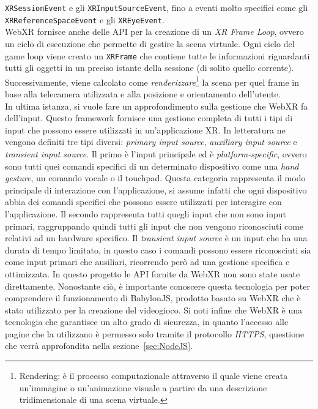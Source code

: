 \texttt{XRSessionEvent} e gli \texttt{XRInputSourceEvent}, fino a eventi molto specifici come gli \texttt{XRReferenceSpaceEvent} e gli \texttt{XREyeEvent}.\\
WebXR fornisce anche delle API per la creazione di un \textit{XR Frame Loop}, ovvero un ciclo di esecuzione che permette di gestire la scena virtuale. Ogni
ciclo del game loop viene creato un \texttt{XRFrame} che contiene tutte le informazioni riguardanti tutti gli oggetti in un preciso istante della sessione (di solito quello corrente).
Successivamente, viene calcolato come \textit{renderizzare}\footnote{Rendering: è il processo computazionale attraverso il quale viene creata un'immagine o un'animazione visuale a 
partire da una descrizione tridimensionale di una scena virtuale.} la scena per quel frame in base alla telecamera utilizzata e alla posizione e orientamento dell'utente.\\
\newline
In ultima istanza, si vuole fare un approfondimento sulla gestione che WebXR fa dell'input. Questo framework fornisce una gestione completa di tutti i tipi di input che possono
essere utilizzati in un'applicazione XR. In letteratura ne vengono definiti tre tipi diversi: \textit{primary input source}, \textit{auxiliary input source} e \textit{transient
input source}. Il primo è l'input principale ed è \textit{platform-specific}, ovvero sono tutti quei comandi specifici di un determinato dispositivo come una \textit{hand gesture},
un comando vocale o il touchpad. Questa categoria rappresenta il modo principale di interazione con l'applicazione, si assume infatti che ogni dispositivo abbia dei comandi specifici
che possono essere utilizzati per interagire con l'applicazione. Il secondo rappresenta tutti quegli input che non sono input primari, raggruppando quindi tutti gli input
che non vengono riconosciuti come relativi ad un hardware specifico. Il \textit{transient input source} è un input che ha una durata di tempo limitato, in questo caso i comandi
possono essere riconosciuti sia come input primari che ausiliari, ricorrendo però ad una gestione specifica e ottimizzata.
\newline \newline
In questo progetto le API fornite da WebXR non sono state usate direttamente. Nonostante ciò, è importante conoscere questa tecnologia per poter comprendere il funzionamento
di BabylonJS, prodotto basato su WebXR che è stato utilizzato per la creazione del videogioco. Si noti infine che WebXR è una tecnologia che garantisce un alto grado di sicurezza, in quanto
l'accesso alle pagine che la utilizzano è permesso solo tramite il protocollo \textit{HTTPS}, questione che verrà approfondita nella sezione~\ref{sec:NodeJS}. 


